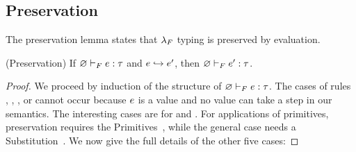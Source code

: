 \subsection{Preservation} \label{sec:sysf:preservationF}
%
The preservation lemma states that $\lambda_{F}$ typing is preserved
by evaluation.
%
\begin{lemma} (Preservation) \label{lem:preservationFF} 
If ${\varnothing} \vdash_F {e} : {\tau}$ and $e \hookrightarrow e'$, 
then ${\varnothing} \vdash_F {e'} : {\tau}$.
\end{lemma}    
\begin{proof} 
  We proceed by induction of the structure of 
  ${\varnothing} \vdash_F {e} : {\tau}$. The cases of rules
  \fPrim, \fVar, \fAbs, or \fTAbs cannot occur because $e$ is a value
  and no value can take a step in our semantics.
  The interesting cases are for \fApp and \fTApp.
  For applications of primitives, preservation 
  requires the Primitives~,
  while the general case needs a Substitution~.
  We now give the full details of the other five cases:


\end{proof}
